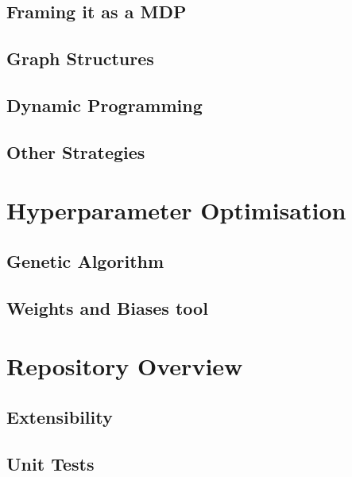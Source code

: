 \subsection{Framing it as a MDP}


\subsection{Graph Structures}


\subsection{Dynamic Programming}


\subsection{Other Strategies}


\section{Hyperparameter Optimisation}


\subsection{Genetic Algorithm}


\subsection{Weights and Biases tool}


\section{Repository Overview}


\subsection{Extensibility}

\subsection{Unit Tests}

